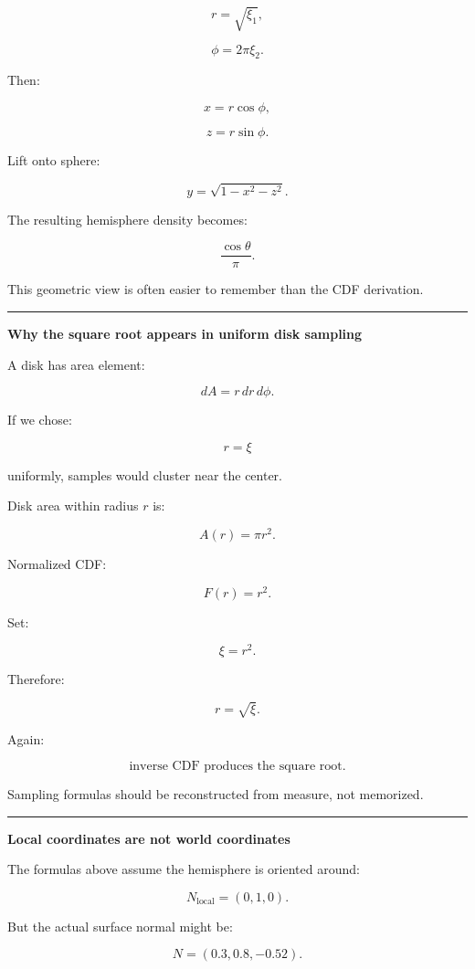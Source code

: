 \[
r=\sqrt{\xi_1},
\]

\[
\phi=2\pi\xi_2.
\]

Then:

\[
x=r\cos\phi,
\]

\[
z=r\sin\phi.
\]

Lift onto sphere:

\[
y=\sqrt{1-x^2-z^2}.
\]

The resulting hemisphere density becomes:

\[
\frac{\cos\theta}{\pi}.
\]

This geometric view is often easier to remember than the CDF derivation.

\begin{center}\rule{0.5\linewidth}{0.5pt}\end{center}

\textbf{Why the square root appears in uniform disk sampling}

A disk has area element:

\[
dA=r\,dr\,d\phi.
\]

If we chose:

\[
r=\xi
\]

uniformly, samples would cluster near the center.

Disk area within radius \(r\) is:

\[
A(r)=\pi r^2.
\]

Normalized CDF:

\[
F(r)=r^2.
\]

Set:

\[
\xi=r^2.
\]

Therefore:

\[
\boxed{
r=\sqrt{\xi}.
}
\]

Again:

\[
\boxed{
\text{inverse CDF produces the square root.}
}
\]

Sampling formulas should be reconstructed from measure, not memorized.

\begin{center}\rule{0.5\linewidth}{0.5pt}\end{center}

\textbf{Local coordinates are not world coordinates}

The formulas above assume the hemisphere is oriented around:

\[
N_{\text{local}}=(0,1,0).
\]

But the actual surface normal might be:

\[
N=(0.3,0.8,-0.52).
\]

